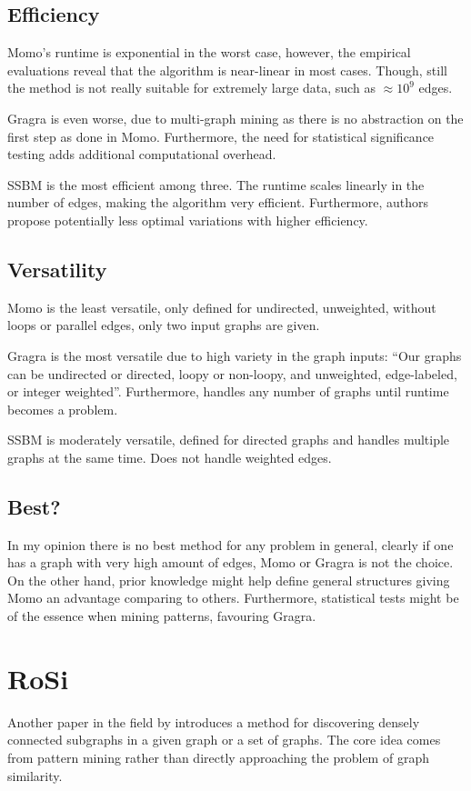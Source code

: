 \documentclass{article}
\begin{document}
\subsection{Efficiency}
Momo's runtime is exponential in the worst case, however, the empirical evaluations reveal that the algorithm is near-linear in most cases. Though, still the method is not really suitable for extremely large data, such as $\approx 10^9$ edges.

Gragra is even worse, due to multi-graph mining as there is no abstraction on the first step as done in Momo. Furthermore, the need for statistical significance testing adds additional computational overhead.

SSBM is the most efficient among three. The runtime scales linearly in the number of edges, making the algorithm very efficient. Furthermore, authors propose potentially less optimal variations with higher efficiency.

\subsection{Versatility}
Momo is the least versatile, only defined for undirected, unweighted, without loops or parallel edges, only two input graphs are given.


Gragra is the most versatile due to high variety in the graph inputs: ``Our graphs can be undirected or directed, loopy or non-loopy, and unweighted, edge-labeled, or integer weighted''. Furthermore, handles any number of graphs until runtime becomes a problem.

SSBM is moderately versatile, defined for directed graphs and handles multiple graphs at the same time. Does not handle weighted edges.

\subsection{Best?}
In my opinion there is no best method for any problem in general, clearly if one has a graph with very high amount of edges, Momo or Gragra is not the choice. On the other hand, prior knowledge might help define general structures giving Momo an advantage comparing to others. Furthermore, statistical tests might be of the essence when mining patterns, favouring Gragra.

\section{RoSi}
Another paper in the field by \cite{kalofolias2019rosi} introduces a method for discovering densely connected subgraphs in a given graph or a set of graphs. The core idea comes from pattern mining rather than directly approaching the problem of graph similarity. 
\end{document}
